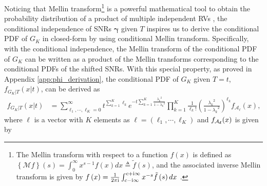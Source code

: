 \documentclass[12pt,onecolumn,draftcls]{IEEEtran}
\newcommand{\bs}{\boldsymbol}
\begin{document}
Noticing that Mellin transform\footnote{
The Mellin transform with respect to a function $f(x)$ is defined as $\left\{ {\mathcal M f} \right\}\left( s \right) = \int\nolimits_0^\infty  {{x^{s - 1}}f\left( x \right)dx} \triangleq \tilde f\left( s \right)$, and the associated inverse Mellin transform is given by $f\left( x \right) = \frac{1}{{2\pi {\rm{i}}}}\int\nolimits_{c - {\rm{i}}\infty }^{c + {\rm{i}}\infty } {{x^{ - s}}\tilde f\left( s \right)dx}$ \cite{debnath2010integral}.} is a powerful mathematical tool to obtain the probability distribution of a product of multiple independent RVs \cite{yilmaz2009productshifted,yilmaz2010outage,chelli2013performance}, the conditional independence of SNRs $\bs \gamma$ given $T$ inspires us to derive the conditional PDF of $G_K$ in closed-form by using conditional Mellin transform. Specifically, with the conditional independence, the Mellin transform of the conditional PDF of $G_K$ can be written as a product of the Mellin transforms corresponding to the conditional PDFs of the shifted SNRs. With this special property, as proved in Appendix \ref{app:phi_derivation}, the conditional PDF of $G_K$ given $T=t$, ${f_{\left. G_K \right|T}}(x|t)$, can be derived as
\begin{align}\label{eqn:g_hat_cond_t}
 {f_{\left. { G_K} \right|T}}\left( {\left. x \right|t} \right)
& = \sum\limits_{{\ell_1}, \cdots ,{\ell_K} = 0}^\infty  {{t^{\sum\nolimits_{k = 1}^K {{\ell_k}} }}{e^{ - t\sum\nolimits_{k = 1}^K {\frac{{{\lambda _k}^2}}{{1 - {\lambda _k}^2}}} }}\prod\limits_{k = 1}^K {\frac{1}{{{\ell_k}!}}{{{{\left( {\frac{{{\lambda _k}^2}}{{1 - {\lambda _k}^2}}} \right)}^{{\ell_k}}}}}} } {f_{{{ {\mathcal A}}_{\bs{\ell}}}}}(x),
\end{align}
where ${ \bs{\ell}}$ is a vector with $K$ elements as ${ \bs{\ell}} = (\ell_1,\cdots,\ell_K)$ and ${{f_{{{ {\cal A}}_{\bs{\ell}}}}}(x)}$ is given by
\end{document}
